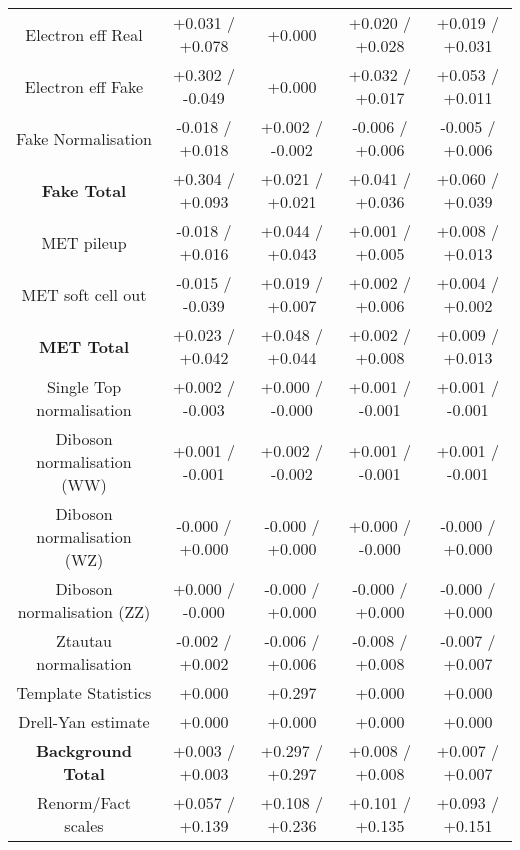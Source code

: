 \begin{table}[htbp]
\begin{center}
\begin{tabular}{|c|c|c|c|c|}
Electron eff Real                     &+0.031   / +0.078   & +0.000              & +0.020   / +0.028   & +0.019   / +0.031  \\
Electron eff Fake                     &+0.302   / -0.049   & +0.000              & +0.032   / +0.017   & +0.053   / +0.011  \\
Fake Normalisation                    &-0.018   / +0.018   & +0.002   / -0.002   & -0.006   / +0.006   & -0.005   / +0.006  \\
\hline
\textbf{Fake Total}                   &+0.304   / +0.093   & +0.021   / +0.021   & +0.041   / +0.036   & +0.060   / +0.039  \\
\hline
MET pileup                            &-0.018   / +0.016   & +0.044   / +0.043   & +0.001   / +0.005   & +0.008   / +0.013  \\
MET soft cell out                     &-0.015   / -0.039   & +0.019   / +0.007   & +0.002   / +0.006   & +0.004   / +0.002  \\
\hline
\textbf{MET Total}                    &+0.023   / +0.042   & +0.048   / +0.044   & +0.002   / +0.008   & +0.009   / +0.013  \\
\hline
Single Top normalisation              &+0.002   / -0.003   & +0.000   / -0.000   & +0.001   / -0.001   & +0.001   / -0.001  \\
Diboson normalisation (WW)            &+0.001   / -0.001   & +0.002   / -0.002   & +0.001   / -0.001   & +0.001   / -0.001  \\
Diboson normalisation (WZ)            &-0.000   / +0.000   & -0.000   / +0.000   & +0.000   / -0.000   & -0.000   / +0.000  \\
Diboson normalisation (ZZ)            &+0.000   / -0.000   & -0.000   / +0.000   & -0.000   / +0.000   & -0.000   / +0.000  \\
Ztautau normalisation                 &-0.002   / +0.002   & -0.006   / +0.006   & -0.008   / +0.008   & -0.007   / +0.007  \\
Template Statistics                   &+0.000              & +0.297              & +0.000              & +0.000             \\
Drell-Yan estimate                    &+0.000              & +0.000              & +0.000              & +0.000             \\
\hline
\textbf{Background Total}             &+0.003   / +0.003   & +0.297   / +0.297   & +0.008   / +0.008   & +0.007   / +0.007  \\
\hline
Renorm/Fact scales                    &+0.057   / +0.139   & +0.108   / +0.236   & +0.101   / +0.135   & +0.093   / +0.151  \\

\end{tabular}
\end{center}
\end{table}
